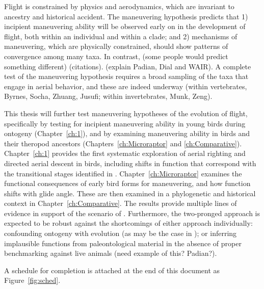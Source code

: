 Flight is constrained by physics and aerodynamics, which are invariant to ancestry and historical accident.  The maneuvering hypothesis predicts that 1) incipient maneuvering ability will be observed early on in the development of flight, both within an individual and within a clade; and 2) mechanisms of maneuvering, which are physically constrained, should show patterns of convergence among many taxa. In contrast, (some people would predict something different) (citations).  (explain Padian, Dial and WAIR).  A complete test of the maneuvering hypothesis requires a broad sampling of the taxa that engage in aerial behavior, and these are indeed underway (within vertebrates, Byrnes, Socha, Zhuang, Jusufi; within invertebrates, Munk, Zeng).
     
This thesis will further test maneuvering hypotheses of the evolution of flight, specifically by testing for incipient maneuvering ability in young birds during ontogeny (Chapter~\ref{ch:1}), and by examining maneuvering ability in birds and their theropod ancestors (Chapters~\ref{ch:Microraptor} and \ref{ch:Comparative}).  Chapter~\ref{ch:1} provides the first systematic exploration of aerial righting and directed aerial descent in birds, including shifts in function that correspond with the transitional stages identified in \citep{Dudley:2011}.  Chapter~\ref{ch:Microraptor} examines the functional consequences of early bird forms for maneuvering, and how function shifts with glide angle.  These are then examined in a phylogenetic and historical context in Chapter~\ref{ch:Comparative}.  The results provide multiple lines of evidence in support of the scenario of \citep{Dudley:2011}.  Furthermore, the two-pronged approach is expected to be robust against the shortcomings of either approach individually:  confounding ontogeny with evolution (as may be the case in \citep{Dial:2003}); or inferring implausible functions from paleontological material in the absence of proper benchmarking against live animals (need example of this? Padian?).

A schedule for completion is attached at the end of this document as Figure~\ref{fig:sched}.



